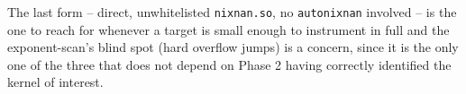 \documentclass[11pt]{article}
\begin{document}
The last form -- direct, unwhitelisted \texttt{nixnan.so}, no
\texttt{autonixnan} involved -- is the one to reach for whenever a target
is small enough to instrument in full and the exponent-scan's blind spot
(hard overflow jumps) is a concern, since it is the only one of the three
that does not depend on Phase 2 having correctly identified the kernel of
interest.
\end{document}
